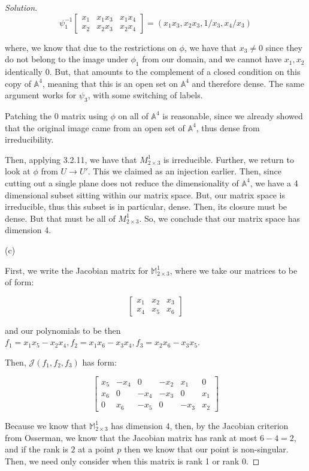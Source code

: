 \documentclass[10pt]{article}
\begin{document}
\begin{proof}[Solution]
$$ \psi_1^{-1}  \begin{bmatrix} x_1 & x_1x_3  & x_1x_4 \\ x_2 & x_2x_3 & x_2x_4 \end{bmatrix} = (x_1x_3, x_2x_3, 1/x_3, x_4/x_3) $$

where, we know that due to the restrictions on $\phi$, we have that $x_3 \not = 0$ since they do not belong to the image under $\phi_1$ from our domain, and we cannot have $x_1,x_2$ identically 0. But, that amounts to the complement of a closed condition on this copy of $\mathbb{A}^4$, meaning that this is an open set on $\mathbb{A}^4$ and therefore dense. The same argument works for $\psi_3$, with some switching of labels.

Patching the $0$ matrix using $\phi$ on all of $\mathbb{A}^4$ is reasonable, since we already showed that the original image came from an open set of $\mathbb{A}^4$, thus dense from irreducibility.

Then, applying 3.2.11, we have that $M^1_{2 \times 3}$ is irreducible. Further, we return to look at $\phi$ from $U \to U'$. This we claimed as an injection earlier. Then, since cutting out a single plane does not reduce the dimensionality of $\mathbb{A}^4$, we have a 4 dimensional subset sitting within our matrix space. But, our matrix space is irreducible, thus this subset is in particular, dense. Then, its closure must be dense. But that must be all of $M^1_{2 \times 3}$. So, we conclude that our matrix space has dimension 4.

(c)

First, we write the Jacobian matrix for $\mathbb{M}_{2\times 3}^1$, where we take our matrices to be of form:

$$ \begin{bmatrix} x_1 & x_2  & x_3 \\ x_4 & x_5 & x_6 \end{bmatrix} $$

and our polynomials to be then $f_1 = x_1x_5 - x_2x_4, f_2  = x_1x_6 - x_3x_4, f_3 = x_2x_6 - x_3x_5$.

Then, $\mathcal{J}(f_1,f_2,f_3)$ has form:

$$ \begin{bmatrix} x_5 & -x_4  & 0 & -x_2 & x_1 & 0  \\ x_6 & 0 & -x_4 & -x_3 & 0 & x_1  \\ 0 & x_6  & -x_5 & 0 & -x_3 & x_2  \end{bmatrix} $$

Because we know that $\mathbb{M}_{2\times 3}^1$ has dimension 4, then, by the Jacobian criterion from Osserman, we know that the Jacobian matrix has rank at most $6 - 4 = 2$, and if the rank is $2$ at a point $p$ then we know that our point is non-singular. Then, we need only consider when this matrix is rank 1 or rank 0.


\end{proof}
\end{document}

